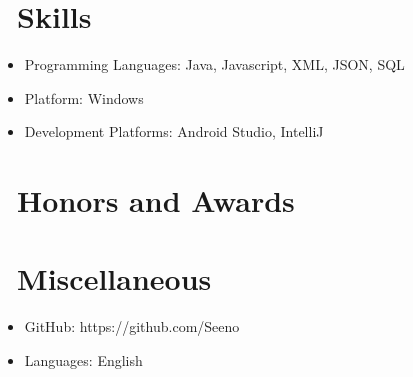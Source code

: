 \documentclass{resume}
\begin{document}

\section{\faCogs\ Skills}
\begin{itemize}[parsep=0.5ex]
  \item Programming Languages: Java, Javascript, XML, JSON, SQL
  \item Platform: Windows
  \item Development Platforms: Android Studio, IntelliJ
\end{itemize}

\section{\faHeartO\ Honors and Awards}


\section{\faInfo\ Miscellaneous}
\begin{itemize}[parsep=0.5ex]
  \item GitHub: {\color{blue}https://github.com/Seeno}
  \item Languages: English
\end{itemize}

%
%
\end{document}
